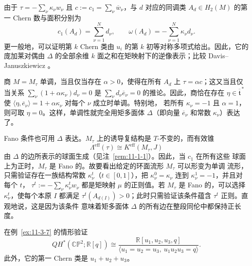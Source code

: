 \begin{remark}\label{rem:11-3-10}
由于 $\tau=-\sum_\nu\kappa_\nu w_\nu$ 且
$c:=c_1=\sum_\nu\overline w_\nu$，与 $d$ 对应的同调类
$A_d\in H_2(M)$ 的第一 Chern 数与面积分别为
\begin{equation}\label{eq:11-3-18}
  c_1(A_d)=\sum_{\nu=1}^Nd_\nu,
  \qquad
  \omega(A_d)=-\sum_{\nu=1}^N\kappa_\nu d_\nu.
\end{equation}
更一般地，可以证明第 $k$ Chern 类由 $u_i$ 的第 $k$ 初等对称多项式给出。因此，它的
庞加莱对偶由 $\Delta$ 的全部余维 $k$ 面之和在矩映射下的逆像表示；比较
Davis--Januszkiewicz 。

商 $M=M_\tau$ 单调，当且仅当存在 $\alpha>0$，使得在所有 $A_d$ 上
$\tau=\alpha c$；这又当且仅当关系
$\sum_\nu(1+\alpha\kappa_\nu)d_\nu=0$ 是
$\sum_\nu d_\nu\overline e_\nu=0$ 的推论。因此，商恰在存在
$\eta\in\overline{\mathfrak t}^{\,*}$ 使
$\langle\eta,\overline e_\nu\rangle=1+\alpha\kappa_\nu$ 对每个 $\nu$ 成立时单调。特别地，
若所有 $\kappa_\nu=-1$ 且 $\alpha=1$，则可取 $\eta=0$。这样，单调性就完全用矩多面体
$\Delta$（即向量 $\overline e_\nu$ 和常数 $\kappa_\nu$）表达了。

Fano 条件也可用 $\Delta$ 表达。$M_\tau$ 上的诱导复结构是 $T$-不变的，而有效锥
\[
  \Lambda^{\mathrm{eff}}(\tau)\cong K^{\mathrm{eff}}(M_\tau,J)
\]
由 $\Delta$ 的边所表示的球面生成（见注~\ref{rem:11-1-1}）。因此，当 $c_1$ 在所有这些
球面上为正时，$M_\tau$ 是 Fano 的。故要看出给定的环面流形 $M_\tau$ 可以形变为单调
流形，只需验证存在一族结构常数 $\kappa_\nu^t$（$t\in[0,1]$），把
$\kappa_\nu^0=\kappa_\nu$ 连到 $\kappa_\nu^1=-1$，并且对每个 $t$，
$\tau^t:=-\sum_\nu\kappa_\nu^t w_\nu$ 都是矩映射 $\mu$ 的正则值。若 $M_\tau$ 是 Fano
的，可以选择 $\kappa_\nu^t$，使每个本原 $I$ 都满足
$\tau^t(A_{d(I)})>0$；此时只需验证该条件蕴含 $\tau^t$ 正则。直观地说，这是因为该条件
意味着矩多面体 $\Delta$ 的所有边在整段同伦中都保持正长度。
\end{remark}

\begin{exercise}\label{ex:11-3-11}
在例~\ref{ex:11-3-7} 的情形验证
\[
  QH^*(\mathbb{CP}^2;\mathbb R[q])
  \cong
  \frac{\mathbb R[u_1,u_2,u_3,q]}
  {\langle u_1=u_2=u_3,\ u_1u_2u_3=q\rangle}.
\]
此外，它的第一 Chern 类是 $u_1+u_2+u_3$。
\end{exercise}

